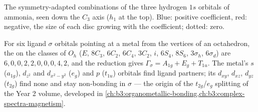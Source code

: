 \begin{omfigure}

{\small The symmetry-adapted combinations of the three hydrogen $1s$ orbitals
of ammonia, seen down the $C_3$ axis ($h_1$ at the top). Blue: positive
coefficient, red: negative, the size of each disc growing with the
coefficient; dotted: zero.}
\end{omfigure}

\begin{example}\label{ex:b3:group-theory-applied:ml6}
For six ligand $\sigma$ orbitals pointing at a metal from the vertices of an
octahedron, the  on the classes of $O_h$ ($E$, $8C_3$, $6C_2$, $6C_4$,
$3C_2$, $i$, $6S_4$, $8S_6$, $3\sigma_h$, $6\sigma_d$) are $6, 0, 0, 2, 2, 0, 0, 0, 4,
2$, and the reduction gives $\Gamma_\sigma = A_{1g} + E_g + T_{1u}$. The metal's $s$
($a_{1g}$), $d_{z^2}$ and $d_{x^2-y^2}$ ($e_g$) and $p$ ($t_{1u}$) orbitals find ligand
partners; its $d_{xy}$, $d_{xz}$, $d_{yz}$ ($t_{2g}$) find none and stay non-bonding
in $\sigma$ --- the origin of the $t_{2g}$/$e_g$ splitting of the Year 2 volume,
developed in \cref{ch:b3:organometallic-bonding,ch:b3:complex-spectra-magnetism}.
\end{example}

